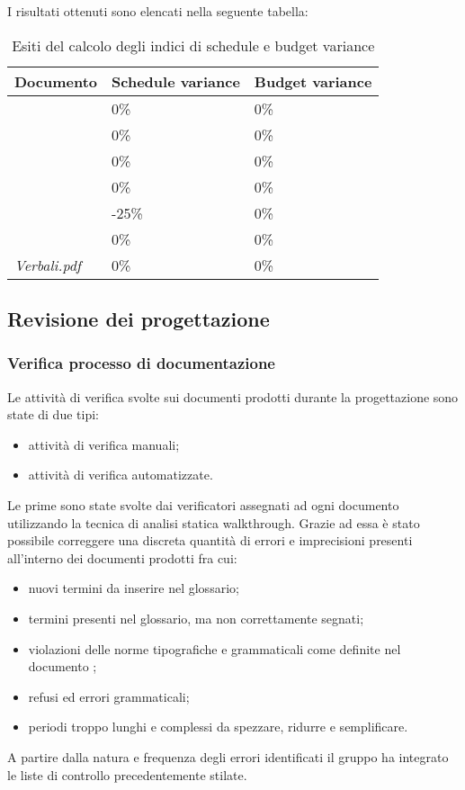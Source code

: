 		I risultati ottenuti sono elencati nella seguente tabella:	
		\begin{table}[H]
		\begin{tabular}{|l|l|l|}
		\hline
		\textbf{Documento} 		&\textbf{Schedule variance} &\textbf{Budget variance} \\
		\hline
		\PdQ 					&0\%		&0\%\\
		\NdP 					&0\%		&0\%\\
		\SdF 					&0\%		&0\%\\
		\AdR 					&0\%		&0\%\\
		\PdP 					&-25\%		&0\%\\
		\Glossario 				&0\%		&0\%\\
		\textit{Verbali.pdf} 	&0\%		&0\%\\
		\hline
		\end{tabular}
		\caption{Esiti del calcolo degli indici di schedule e budget variance}
		\end{table}


	\subsection{Revisione dei progettazione}
		\subsubsection{Verifica processo di documentazione}
		Le attività di verifica svolte sui documenti prodotti durante la progettazione sono state di due tipi:
		\begin{itemize}		
			\item attività di verifica manuali;
			\item attività di verifica automatizzate.
		\end{itemize}
		
		Le prime sono state svolte dai verificatori assegnati ad ogni documento utilizzando la tecnica di 					analisi statica walkthrough. Grazie ad essa è stato possibile correggere una discreta quantità di errori e imprecisioni presenti all'interno dei documenti prodotti fra cui: 
		\begin{itemize}	
			\item nuovi termini da inserire nel glossario;
			\item termini presenti nel glossario, ma non correttamente segnati;
			\item violazioni delle norme tipografiche e grammaticali come definite nel documento \NdP;
			\item refusi ed errori grammaticali;
			\item periodi troppo lunghi e complessi da spezzare, ridurre e semplificare.
		\end{itemize}
		A partire dalla natura e frequenza degli errori identificati il gruppo ha integrato le liste di controllo precedentemente stilate.

